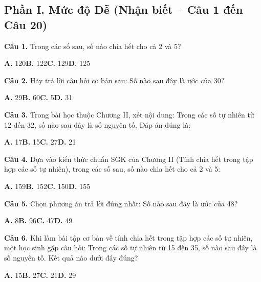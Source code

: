 \documentclass[11pt,a4paper]{article}
\begin{document}
\subsection*{\color{accent} Phần I. Mức độ Dễ (Nhận biết -- Câu 1 đến Câu 20)}
\textbf{\color{primary} Câu 1.} Trong các số sau, số nào chia hết cho cả 2 và 5?\par
\hspace*{1.5em}\textbf{A.} 120\quad\quad \textbf{B.} 122\quad\quad \textbf{C.} 129\quad\quad \textbf{D.} 125\par\vspace{2pt}
\textbf{\color{primary} Câu 2.} Hãy trả lời câu hỏi cơ bản sau: Số nào sau đây là ước của 30?\par
\hspace*{1.5em}\textbf{A.} 29\quad\quad \textbf{B.} 60\quad\quad \textbf{C.} 5\quad\quad \textbf{D.} 31\par\vspace{2pt}
\textbf{\color{primary} Câu 3.} Trong bài học thuộc Chương II, xét nội dung: Trong các số tự nhiên từ 12 đến 32, số nào sau đây là số nguyên tố. Đáp án đúng là:\par
\hspace*{1.5em}\textbf{A.} 17\quad\quad \textbf{B.} 15\quad\quad \textbf{C.} 27\quad\quad \textbf{D.} 21\par\vspace{2pt}
\textbf{\color{primary} Câu 4.} Dựa vào kiến thức chuẩn SGK của Chương II (Tính chia hết trong tập hợp các số tự nhiên), trong các số sau, số nào chia hết cho cả 2 và 5:\par
\hspace*{1.5em}\textbf{A.} 159\quad\quad \textbf{B.} 152\quad\quad \textbf{C.} 150\quad\quad \textbf{D.} 155\par\vspace{2pt}
\textbf{\color{primary} Câu 5.} Chọn phương án trả lời đúng nhất: Số nào sau đây là ước của 48?\par
\hspace*{1.5em}\textbf{A.} 8\quad\quad \textbf{B.} 96\quad\quad \textbf{C.} 47\quad\quad \textbf{D.} 49\par\vspace{2pt}
\textbf{\color{primary} Câu 6.} Khi làm bài tập cơ bản về tính chia hết trong tập hợp các số tự nhiên, một học sinh gặp câu hỏi: Trong các số tự nhiên từ 15 đến 35, số nào sau đây là số nguyên tố. Kết quả nào dưới đây đúng?\par
\hspace*{1.5em}\textbf{A.} 15\quad\quad \textbf{B.} 27\quad\quad \textbf{C.} 21\quad\quad \textbf{D.} 29\par\vspace{2pt}
\end{document}
